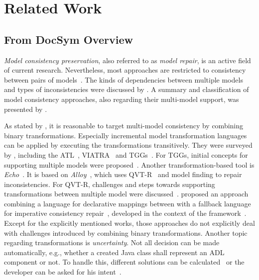 \chapter{Related Work
}
\label{chap:relatedwork}

\section{From DocSym Overview}
\emph{Model consistency preservation}, also referred to as %
\emph{model repair}, is an active field of current research. 
Nevertheless, most approaches are restricted to consistency between pairs of models~\cite{stevens2017a}.
The kinds of dependencies between multiple models and types of inconsistencies were discussed by \textcite{kolovos2008a}. 
A summary and classification of model consistency approaches, also regarding their multi-model support, was presented by \textcite{macedo2015a}.

As stated by \textcite{stevens2017a}, it is reasonable to target multi-model consistency by combining binary transformations.
Especially incremental model transformation languages %
can be applied by executing the transformations transitively.
They were surveyed by \textcite{etzlstorfer2013a}, including the \ac{ATL}~\cite{jouault2006a,xiong2007a}, VIATRA~\cite{bergmann2015viatra} and \acp{TGG}~\cite{anjorin2014b,anjorin2014c}. 
For \acp{TGG}, initial concepts for supporting multiple models were proposed~\cite{trollmann2015a,trollmann2016a}. 
Another transformation-based tool is \emph{Echo}~\cite{macedo2013b}. 
It is based on \emph{Alloy}~\cite{macedo2013a}, which uses \mbox{QVT-R}~\cite{qvt} and model finding to repair inconsistencies. 
For \mbox{QVT-R}, challenges and steps towards supporting transformations between multiple model were discussed~\cite{macedo2014a}.
\citeauthor{kramer2017a} proposed an approach combining a language for declarative mappings between \metamodels with a fallback language for imperative consistency repair~\cite{kramer2017a, klare2016b}, developed in the context of the \vitruv framework~\cite{kramer2015a}. %
Except for the explicitly mentioned works, those approaches do not explicitly deal with challenges introduced by combining binary transformations.
Another topic regarding transformations is \emph{uncertainty}. Not all decision can be made automatically, e.g., whether a created Java class shall represent an \ac{ADL} component or not. To handle this, different solutions can be calculated~\cite{eramo2015uncertainty} or the developer can be asked for his intent~\cite{langhammer2014a}.

